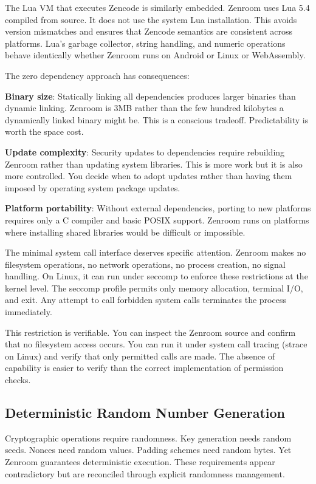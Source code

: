 The Lua VM that executes Zencode is similarly embedded. Zenroom uses
Lua 5.4 compiled from source. It does not use the system Lua
installation. This avoids version mismatches and ensures that Zencode
semantics are consistent across platforms. Lua's garbage collector,
string handling, and numeric operations behave identically whether
Zenroom runs on Android or Linux or WebAssembly.

The zero dependency approach has consequences:

\textbf{Binary size}: Statically linking all dependencies produces
larger binaries than dynamic linking. Zenroom is 3MB rather than the
few hundred kilobytes a dynamically linked binary might be. This is a
conscious tradeoff. Predictability is worth the space cost.

\textbf{Update complexity}: Security updates to dependencies require
rebuilding Zenroom rather than updating system libraries. This is more
work but it is also more controlled. You decide when to adopt updates
rather than having them imposed by operating system package updates.

\textbf{Platform portability}: Without external dependencies, porting
to new platforms requires only a C compiler and basic POSIX
support. Zenroom runs on platforms where installing shared libraries
would be difficult or impossible.

The minimal system call interface deserves specific attention. Zenroom
makes no filesystem operations, no network operations, no process
creation, no signal handling. On Linux, it can run under seccomp to
enforce these restrictions at the kernel level. The seccomp profile
permits only memory allocation, terminal I/O, and exit. Any attempt to
call forbidden system calls terminates the process immediately.

This restriction is verifiable. You can inspect the Zenroom source and
confirm that no filesystem access occurs. You can run it under system
call tracing (strace on Linux) and verify that only permitted calls
are made. The absence of capability is easier to verify than the
correct implementation of permission checks.

\subsection{Deterministic Random Number Generation}

Cryptographic operations require randomness. Key generation needs
random seeds. Nonces need random values. Padding schemes need random
bytes. Yet Zenroom guarantees deterministic execution. These
requirements appear contradictory but are reconciled through explicit
randomness management.

